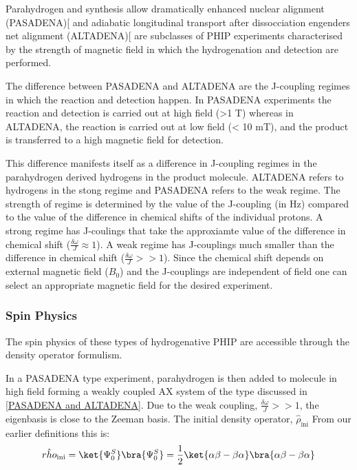 Parahydrogen and synthesis allow dramatically enhanced nuclear alignment (PASADENA)[\citep{RN129} and adiabatic longitudinal transport after dissocciation engenders net alignment (ALTADENA)[\citep{RN128}
 are subclasses of PHIP experiments characterised by the strength of magnetic
field in which the hydrogenation and detection are performed.

The difference between PASADENA and ALTADENA are the J-coupling regimes in which the reaction and detection happen. In PASADENA experiments the reaction and detection is carried out at high field (>1 T) whereas in
ALTADENA, the reaction is carried out at low field (< 10 mT), and the product is transferred to a high magnetic field for detection\citep{RN130}.

This difference manifests itself as a difference in J-coupling regimes in the parahydrogen derived hydrogens in the product molecule. ALTADENA refers to hydrogens in the stong regime and PASADENA refers to the weak regime. The strength of regime is determined by the value of the J-coupling (in Hz) compared to the value of the difference in chemical shifts of the individual protons.
A strong regime has J-coulings that take the approxiamte value of the difference in chemical shift ($\frac{\delta{\omega}}{J}\approx1$). A weak regime has J-couplings much smaller than the difference in chemical shift ($\frac{\delta{\omega}}{J}>>1$). Since the chemical shift depends on external magnetic field ($B_{0}$) and the J-couplings are independent of field one can select an appropriate magnetic field for the desired experiment.

\subsubsection{Spin Physics}

The spin physics of these types of hydrogenative PHIP are
accessible through the density operator formulism.

In a PASADENA type experiment, parahydrogen is then added to molecule in high field forming a weakly coupled AX
system of the type discussed in \ref{PASADENA and ALTADENA}. Due to the weak coupling, $\frac{\delta{\omega}}{J}>>1$, the eigenbasis is close to the Zeeman basis. The initial density operator, $\hat{\rho}_{\text{ini}}$ From our earlier
definitions this is:
\begin{equation}
  \hat{rho}_{\text{ini}} = \ket{\Psi_{0}^{S}}\bra{\Psi_{0}^{S}} = \frac{1}{2}\ket{\alpha\beta -
  \beta\alpha}\bra{\alpha\beta - \beta\alpha}
\end{equation}

